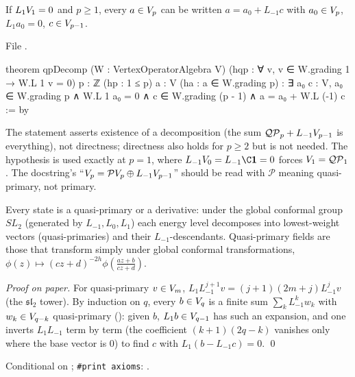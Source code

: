 \begin{theorem}\label{l04:thm:qp}
If $L_1V_1 = 0$ and $p\ge1$, every $a\in V_p$ can be written $a = a_0+L_{-1}c$ with $a_0\in V_p$,
$L_1a_0 = 0$, $c\in V_{p-1}$.
\end{theorem}
\noindent File .
\begin{leancode}
theorem qpDecomp (W : VertexOperatorAlgebra V)
    (hqp : ∀ v, v ∈ W.grading 1 → W.L 1 v = 0)
    {p : ℤ} (hp : 1 ≤ p) {a : V} (ha : a ∈ W.grading p) :
    ∃ a₀ c : V, a₀ ∈ W.grading p ∧ W.L 1 a₀ = 0 ∧ c ∈ W.grading (p - 1) ∧ a = a₀ + W.L (-1) c := by
\end{leancode}
\begin{dictionary}
The statement asserts existence of a decomposition (the sum $\mathcal{QP}_p+L_{-1}V_{p-1}$ is everything),
not directness; directness also holds for $p\ge2$ but is not needed. The hypothesis  is used
exactly at $p = 1$, where $L_{-1}\lfourV_0 = L_{-1}\C\lfourvac = 0$ forces $V_1 = \mathcal{QP}_1$. The docstring's
``$V_p = \mathcal{P}V_p\oplus L_{-1}V_{p-1}$'' should be read with $\mathcal P$ meaning
quasi-primary, not primary.
\end{dictionary}
\begin{physics}
Every state is a quasi-primary or a derivative: under the global conformal group $SL_2$ (generated by
$L_{-1},L_0,L_1$) each energy level decomposes into lowest-weight vectors (quasi-primaries) and their
$L_{-1}$-descendants. Quasi-primary fields are those that transform simply under global conformal
transformations, $\phi(z)\mapsto(cz+d)^{-2h}\phi(\frac{az+b}{cz+d})$.
\end{physics}
\emph{Proof on paper.} For quasi-primary $v\in V_m$, $L_1L_{-1}^{j+1}v = (j+1)(2m+j)L_{-1}^jv$ (the
$\mathfrak{sl}_2$ tower). By induction on $q$, every $b\in V_q$ is a finite sum $\sum_kL_{-1}^kw_k$ with
$w_k\in V_{q-k}$ quasi-primary (\allowbreak{}\allowbreak{}): given $b$, $L_1b\in V_{q-1}$ has such an
expansion, and one inverts $L_1L_{-1}$ term by term (the coefficient $(k+1)(2q-k)$ vanishes only where the
base vector is $0$) to find $c$ with $L_1(b-L_{-1}c) = 0$. \qed
\begin{status}
Conditional on ; \texttt{\#print axioms}: .
\end{status}

